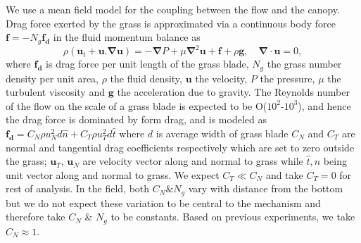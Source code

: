 \documentclass[aps,prl,twocolumn,showpacs,superscriptaddress,groupedaddress,10pt]{revtex4-1}  %
\newcommand{\bu}{\mathbf{u}}
\newcommand{\grad}{\mathbf{\nabla}}
\begin{document}
We use a mean field model for the coupling between the flow and the canopy. Drag force exerted by the grass is approximated via a 
continuous body force $\mathbf{f}=-N_g\mathbf{f_d}$ in the fluid momentum balance\cite{Vivoni98,Nepf99,Ghisal02,Delangre04,Delangre06} as
\begin{equation}
\rho \left(\bu_{t}+\bu.\grad\bu \right) = -\grad P+\mu\grad^{2}\bu +\mathbf{f}+\rho\mathbf{g}, \quad \grad\cdot\bu = 0,
\label{navier-stokes}
\end{equation}
where $\mathbf{f_{d}}$ is drag force per unit length of the grass blade, $N_g$ the grass number density per unit area, $\rho$ the fluid density, $\mathbf{u}$ the velocity, 
$P$ the pressure, $\mu$ the turbulent viscosity and $\mathbf{g}$ the acceleration due to gravity. The Reynolds number of the flow on the scale of a grass blade is expected to 
be O($10^2$-$10^3$), and hence the drag force is dominated by form drag, and is modeled 
as $\mathbf{f_{d}}=C_N \rho u_{N}^{2}d\hat{n}+C_{T}\rho u_{T}^{2}d\hat{t}$ where $d$ is average width of grass blade
$C_{N}$ and $C_{T}$ are normal and tangential drag coefficients respectively which are set to zero outside the grass; $\bu_{T}$, $\bu_{N}$ are velocity vector along and
normal to grass while $\hat{t},\hat{n}$ being unit vector along and normal to grass. We expect $C_T \ll C_N$ and take $C_T=0$ for rest of analysis. In the field, both $C_N \& N_g$ 
vary with distance from the bottom but we do not expect these variation to be central to the mechanism and therefore take $C_N$ \& $N_g$ to be constants. Based on previous experiments\cite{Vivoni98}, we take $C_N \approx 1$.
\end{document}
